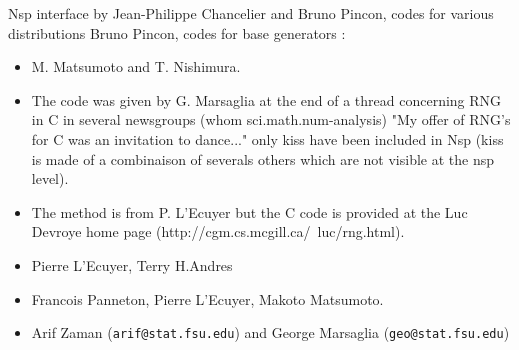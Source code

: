 \begin{authors}

  Nsp interface by Jean-Philippe Chancelier and Bruno Pincon, codes for
  various distributions Bruno Pincon, codes for base generators :
\begin{itemize}
  \item {} 
  M. Matsumoto and  T. Nishimura.
  
  \item {} 
  The code was given by G. Marsaglia at the end of a thread concerning RNG in C in several 
  newsgroups (whom sci.math.num-analysis) "My offer of  RNG's for C was an invitation 
  to dance..." only kiss have been included in Nsp (kiss is made of a combinaison of 
  severals others which are not visible at the nsp level).
  
  \item {} 
  The method is from P. L'Ecuyer but the C code is provided at the Luc  Devroye home page 
  (http://cgm.cs.mcgill.ca/~luc/rng.html).
  
  \item {} 
  Pierre L'Ecuyer, Terry H.Andres
  
  \item {} 
  Francois Panneton, Pierre L'Ecuyer, Makoto Matsumoto.
   
  \item {} 
  Arif Zaman (\verb+arif@stat.fsu.edu+) and George Marsaglia (\verb+geo@stat.fsu.edu+)
\end{itemize}
\end{authors}

